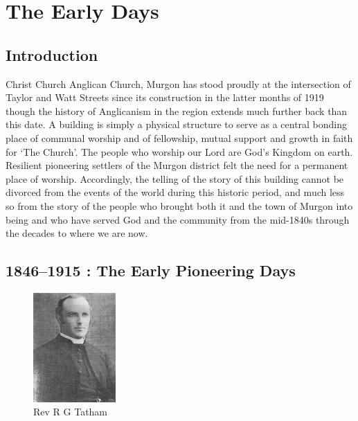 \chapter{The Early Days}

\section{Introduction}

Christ Church Anglican Church, Murgon has stood proudly at the
intersection of Taylor and Watt Streets since its construction in the
latter months of 1919 though the history of Anglicanism in the region
extends much further back than this date. A building is simply a
physical structure to serve as a central bonding place of communal
worship and of fellowship, mutual support and growth in faith for `The
Church'. The people who worship our Lord are God's Kingdom on earth.
Resilient pioneering settlers of the Murgon district felt the need for a
permanent place of worship. Accordingly, the telling of the story of
this building cannot be divorced from the events of the world during
this historic period, and much less so from the story of the people who
brought both it and the town of Murgon into being and who have served
God and the community from the mid-1840s through the decades to where we
are now.

\section{1846--1915 : The Early Pioneering
Days}




\begin{figure}
\begin{center}
\includegraphics[width=0.28\textwidth,right]{images/RGTatham.jpg}
\caption{Rev R G Tatham}
\end{center}
\end{figure}


